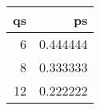 \begin{tabular}{rr}
\toprule
 qs &        ps \\
\midrule
  6 &  0.444444 \\
  8 &  0.333333 \\
 12 &  0.222222 \\
\bottomrule
\end{tabular}
